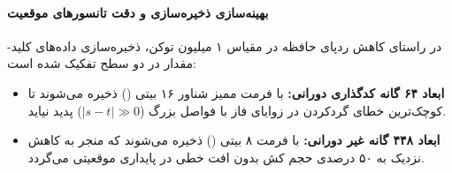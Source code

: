 \paragraph*{بهینه‌سازی ذخیره‌سازی و دقت تانسورهای موقعیت}
در راستای کاهش ردپای حافظه  در مقیاس ۱ میلیون توکن، ذخیره‌سازی داده‌های کلید-مقدار در دو سطح تفکیک شده است:
\begin{itemize}
    \item \textbf{ابعاد ۶۴ گانه کدگذاری دورانی:} با فرمت ممیز شناور ۱۶ بیتی () ذخیره می‌شوند تا کوچک‌ترین خطای گردکردن در زوایای فاز با فواصل بزرگ ($|s - t| \gg 0$) پدید نیاید.
    \item \textbf{ابعاد ۴۴۸ گانه غیر دورانی:} با فرمت ۸ بیتی () ذخیره می‌شوند که منجر به کاهش نزدیک به ۵۰ درصدی حجم کش بدون افت خطی در پایداری موقعیتی می‌گردد.
\end{itemize}

